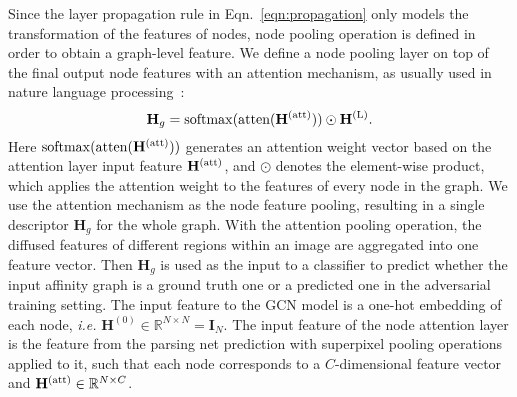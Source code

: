 \documentclass[10pt, letterpaper]{article}
\begin{document}
Since the layer propagation rule in Eqn.~\eqref{eqn:propagation} only models the transformation of the features of nodes, node pooling operation is defined in order to obtain a graph-level feature. We define a node pooling layer on top of the final output node features with an attention mechanism, as usually used in nature language processing~\cite{lin2017structured,li2015gated}:
\begin{equation}
\mathbf{H}_g = \rm{softmax}(atten(\mathbf{H}^{(\rm{att})})) \odot \mathbf{H}^{(L)}.
\end{equation}
Here $\rm{softmax}(\rm{atten}(\mathbf{H}^{(\rm{att})}))$ generates an attention weight vector based on the attention layer input feature $\mathbf{H}^{(\rm{att})}$, and $\odot$ denotes the element-wise product, which applies the attention weight to the features of every node in the graph. We use the attention mechanism as the node feature pooling, resulting in a single descriptor $\mathbf{H}_g$ for the whole graph. With the attention pooling operation, the diffused features of different regions within an image are aggregated into one feature vector. Then $\mathbf{H}_g$ is  used as the input to a classifier to predict whether the input affinity graph is a ground truth one or a predicted one in the adversarial training setting. The input feature to the GCN model is a one-hot embedding of each node, \emph{i.e.}  $\mathbf{H}^{(0)} \in \mathbb{R}^{N\times N} =  \mathbf{I}_N$. The input feature of the node attention layer is the feature from the parsing net prediction with superpixel pooling operations applied to it, such that each node corresponds to a $C$-dimensional feature vector and $\mathbf{H}^{(\rm{att})} \in \mathbb{R}^{N\times C} $.
\end{document}
